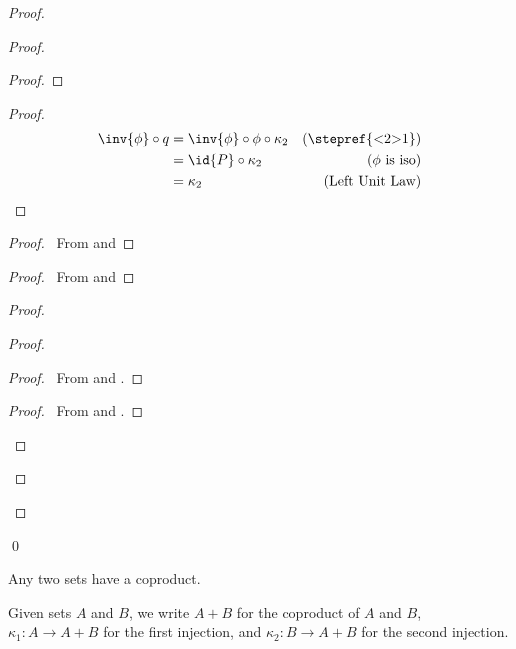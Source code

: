 \begin{proof}
\begin{proof}
\begin{proof}
    \end{proof}
    \begin{proof}
      \pf
      \begin{align*}
        \inv{\phi} \circ q & = \inv{\phi} \circ \phi \circ \kappa_2 & (\text{\stepref{<2>1}})\\
        & = \id{P} \circ \kappa_2 & (\text{$\phi$ is iso})\\
        & = \kappa_2 & (\text{Left Unit Law})
      \end{align*}
    \end{proof}
    \begin{proof}
      \pf\ From  and 
    \end{proof}
    \begin{proof}
      \pf\ From  and 
    \end{proof}
    \begin{proof}
      \begin{proof}
        \begin{proof}
          \pf\ From  and .
        \end{proof}
        \begin{proof}
          \pf\ From  and .
        \end{proof}
      \end{proof}
    \end{proof}
  \end{proof}
  \qed
\end{proof}

\begin{ax}[Coproduct]
  Any two sets have a coproduct.
\end{ax}

Given sets $A$ and $B$, we write $A + B$ for the coproduct of $A$ and $B$, $\kappa_1 : A \rightarrow A + B$ for the first injection, and $\kappa_2 : B \rightarrow A + B$ for the second injection.

